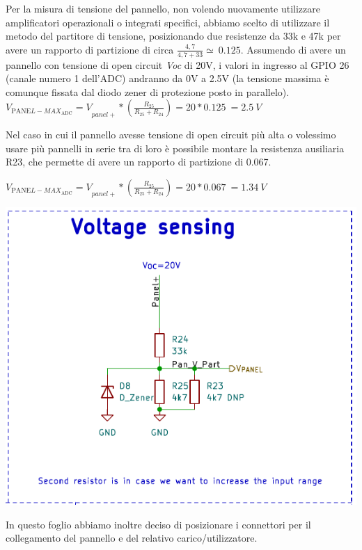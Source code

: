 Per la misura di tensione del pannello, non volendo nuovamente
utilizzare amplificatori operazionali o integrati specifici, abbiamo
scelto di utilizzare il metodo del partitore di tensione, posizionando
due resistenze da 33k e 47k per avere un rapporto di partizione di circa
\(\frac{4,7}{4,7 + 33} \simeq \ 0.125\). Assumendo di avere un pannello
con tensione di open circuit \emph{Voc} di 20V, i valori in ingresso al
GPIO 26 (canale numero 1 dell'ADC) andranno da 0V a 2.5V (la tensione
massima è comunque fissata dal diodo zener di protezione posto in
parallelo).
\({V_{\text{PANE}{L - MAX}_{\text{ADC}}} = V}_{panel +}*(\frac{R_{25}}{R_{25} + R_{24}}) = 20*0.125\  = 2.5\ V\ \)

Nel caso in cui il pannello avesse tensione di open circuit più alta o
volessimo usare più pannelli in serie tra di loro è possibile montare la
resistenza ausiliaria R23, che permette di avere un rapporto di
partizione di 0.067.

\({V_{\text{PANE}{L - MAX}_{\text{ADC}}} = V}_{panel +}*(\frac{R_{25}}{R_{25} + R_{24}}) = 20*0.067\  = 1.34\ V\)

\begin{center}
\includegraphics[scale=0.7]{figures/image62.png}
\captionsetup{type=figure}
\end{center}

In questo foglio abbiamo inoltre deciso di posizionare i connettori per
il collegamento del pannello e del relativo carico/utilizzatore.

